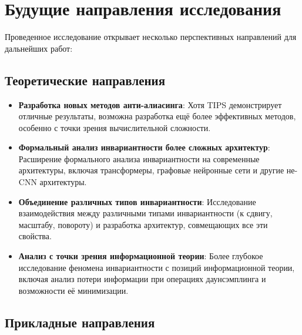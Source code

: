 \section{Будущие направления исследования}
\label{discussion:future}

Проведенное исследование открывает несколько перспективных направлений для дальнейших работ:

\subsection{Теоретические направления}
\label{discussion:future:theoretical}

\begin{itemize}
    \item \textbf{Разработка новых методов анти-алиасинга}: Хотя TIPS демонстрирует отличные результаты, возможна разработка ещё более эффективных методов, особенно с точки зрения вычислительной сложности.
    
    \item \textbf{Формальный анализ инвариантности более сложных архитектур}: Расширение формального анализа инвариантности на современные архитектуры, включая трансформеры, графовые нейронные сети и другие не-CNN архитектуры.
    
    \item \textbf{Объединение различных типов инвариантности}: Исследование взаимодействия между различными типами инвариантности (к сдвигу, масштабу, повороту) и разработка архитектур, совмещающих все эти свойства.
    
    \item \textbf{Анализ с точки зрения информационной теории}: Более глубокое исследование феномена инвариантности с позиций информационной теории, включая анализ потери информации при операциях даунсэмплинга и возможности её минимизации.
\end{itemize}

\subsection{Прикладные направления}
\label{discussion:future:applied}

